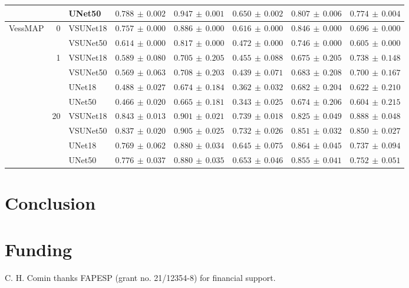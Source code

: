\documentclass[%
reprint,
nofootinbib,
 amsmath,amssymb,
aps,
superscriptaddress,
showkeys,
longbibliography
]{revtex4-1}
\begin{document}
\begin{table}[t]
\begin{tabular}{l r l r r r r r}
         &  & UNet50 & $0.788 \,\pm\, 0.002$ & $0.947 \,\pm\, 0.001$ & $0.650 \,\pm\, 0.002$ & $0.807 \,\pm\, 0.006$ & $0.774 \,\pm\, 0.004$ \\
        \hline
        \multirow{10}{*}{VessMAP} & \multirow{2}{*}{0} & VSUNet18 & $0.757 \,\pm\, 0.000$ & $0.886 \,\pm\, 0.000$ & $0.616 \,\pm\, 0.000$ & $0.846 \,\pm\, 0.000$ & $0.696 \,\pm\, 0.000$ \\
         &  & VSUNet50 & $0.614 \,\pm\, 0.000$ & $0.817 \,\pm\, 0.000$ & $0.472 \,\pm\, 0.000$ & $0.746 \,\pm\, 0.000$ & $0.605 \,\pm\, 0.000$ \\
         \cline{2-8}
         & \multirow{4}{*}{1} & VSUNet18 & $0.589 \,\pm\, 0.080$ & $0.705 \,\pm\, 0.205$ & $0.455 \,\pm\, 0.088$ & $0.675 \,\pm\, 0.205$ & $0.738 \,\pm\, 0.148$ \\
         &  & VSUNet50 & $0.569 \,\pm\, 0.063$ & $0.708 \,\pm\, 0.203$ & $0.439 \,\pm\, 0.071$ & $0.683 \,\pm\, 0.208$ & $0.700 \,\pm\, 0.167$ \\
         &  & UNet18 & $0.488 \,\pm\, 0.027$ & $0.674 \,\pm\, 0.184$ & $0.362 \,\pm\, 0.032$ & $0.682 \,\pm\, 0.204$ & $0.622 \,\pm\, 0.210$ \\
         &  & UNet50 & $0.466 \,\pm\, 0.020$ & $0.665 \,\pm\, 0.181$ & $0.343 \,\pm\, 0.025$ & $0.674 \,\pm\, 0.206$ & $0.604 \,\pm\, 0.215$ \\
         \cline{2-8}
         & \multirow{4}{*}{20} & VSUNet18 & $0.843 \,\pm\, 0.013$ & $0.901 \,\pm\, 0.021$ & $0.739 \,\pm\, 0.018$ & $0.825 \,\pm\, 0.049$ & $0.888 \,\pm\, 0.048$ \\
         &  & VSUNet50 & $0.837 \,\pm\, 0.020$ & $0.905 \,\pm\, 0.025$ & $0.732 \,\pm\, 0.026$ & $0.851 \,\pm\, 0.032$ & $0.850 \,\pm\, 0.027$ \\
         &  & UNet18 & $0.769 \,\pm\, 0.062$ & $0.880 \,\pm\, 0.034$ & $0.645 \,\pm\, 0.075$ & $0.864 \,\pm\, 0.045$ & $0.737 \,\pm\, 0.094$ \\
         &  & UNet50 & $0.776 \,\pm\, 0.037$ & $0.880 \,\pm\, 0.035$ & $0.653 \,\pm\, 0.046$ & $0.855 \,\pm\, 0.041$ & $0.752 \,\pm\, 0.051$ \\
        \hline
    \end{tabular}
    \endgroup
\end{table}



\section{Conclusion}
\label{s:conclusion}



\section*{Funding}
C. H. Comin thanks FAPESP (grant no. 21/12354-8) for financial support. 



\end{document}
